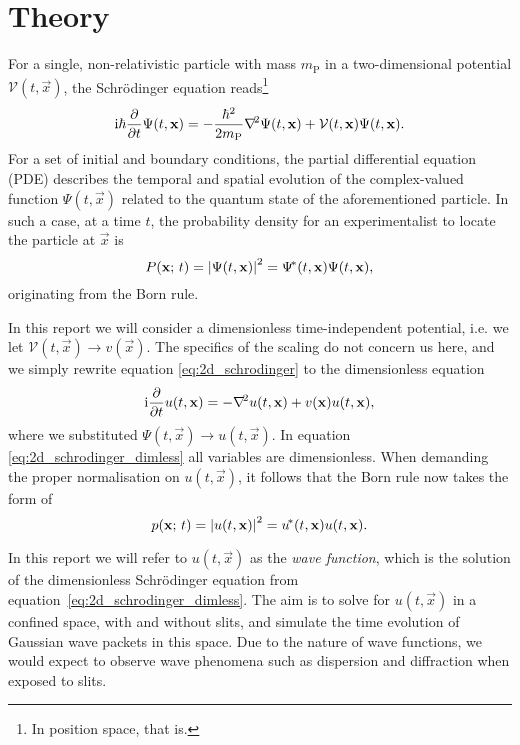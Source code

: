 
\section{Theory}\label{sec:theory}
    For a single, non-relativistic particle with mass $m_\mathrm{P}$ in a two-dimensional potential $\mathcal{V}(t, \vec{x})$, the Schrödinger equation reads\footnote{In position space, that is.}
    \begin{equation}\label{eq:2d_schrodinger}
        \mathrm{i} \hbar \pdv{}{t}\Psi(t, \mathbf{x}) = -\frac{\hbar^2}{2m_\mathrm{P}}\nabla^{\!2} \Psi(t, \mathbf{x})  + \mathcal{V}(t, \mathbf{x}) \Psi(t, \mathbf{x}).
    \end{equation}
    For a set of initial and boundary conditions, the partial differential equation (PDE) describes the temporal and spatial evolution of the complex-valued function $\Psi(t, \vec{x})$ related to the quantum state of the aforementioned particle. In such a case, at a time $t$, the probability density for an experimentalist to locate the particle at $\vec{x}$ is
    \begin{equation}\label{eq:2d_bornrule}
        P(\mathbf{x}; \, t) = \abs{\Psi(t, \mathbf{x})}^2 = \Psi^{\!*}(t, \mathbf{x}) \Psi(t, \mathbf{x}),
    \end{equation} 
    originating from the Born rule.

    In this report we will consider a dimensionless time-independent potential, i.e. we let $\mathcal{V}(t, \vec{x}) \to v(\vec{x})$. The specifics of the scaling do not concern us here, and we simply rewrite equation \eqref{eq:2d_schrodinger} to the dimensionless equation
    \begin{equation}\label{eq:2d_schrodinger_dimless}
        \mathrm{i} \pdv{}{t}u(t, \mathbf{x}) = - \nabla^{\!2}u(t, \mathbf{x})+ v(\mathbf{x})u(t, \mathbf{x}),
    \end{equation}
    where we substituted $\Psi(t, \vec{x}) \to u(t, \vec{x})$. In equation \eqref{eq:2d_schrodinger_dimless} all variables are dimensionless. When demanding the proper normalisation on $u(t,\vec{x})$, it follows that the Born rule now takes the form of
    \begin{equation}\label{eq:2d_bornrule_dimless}
        p(\mathbf{x}; \, t) = \abs{u(t, \mathbf{x})}^2 = u^{\!*} (t, \mathbf{x})u(t, \mathbf{x}).
    \end{equation}

    In this report we will refer to $u(t, \vec{x})$ as the \textit{wave function}, which is the solution of the dimensionless Schrödinger equation from equation~\eqref{eq:2d_schrodinger_dimless}. The aim is to solve for $u(t,\vec{x})$ in a confined space, with and without slits, and simulate the time evolution of Gaussian wave packets in this space. Due to the nature of wave functions, we would expect to observe wave phenomena such as dispersion and diffraction when exposed to slits. 